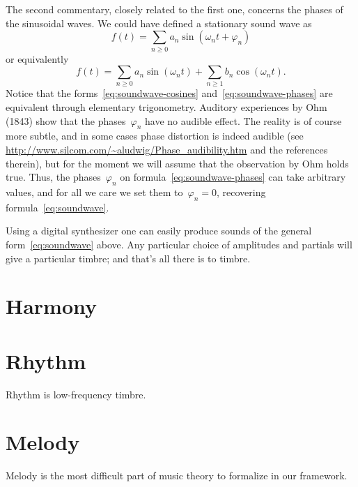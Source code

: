 The second commentary, closely related to the first one, concerns the phases of
the sinusoidal waves.  We could have defined a stationary sound wave as
\begin{equation}\label{eq:soundwave-phases}
	f(t)=\sum_{n\ge 0}a_n\sin(\omega_nt+\varphi_n)
\end{equation}
or equivalently
\begin{equation}\label{eq:soundwave-cosines}
	f(t)=
	\sum_{n\ge 0}a_n\sin(\omega_nt)
	+\sum_{n\ge 1}b_n\cos(\omega_nt).
\end{equation}
Notice that the forms~\ref{eq:soundwave-cosines}
and~\ref{eq:soundwave-phases} are equivalent through elementary trigonometry.
Auditory experiences by Ohm (1843) show that the phases~$\varphi_n$
have no audible effect.  The reality is of course more subtle, and in some
cases phase distortion is indeed audible (see
\url{http://www.silcom.com/~aludwig/Phase_audibility.htm} and the references
therein), but for the moment we will assume that the observation by Ohm holds
true.  Thus, the phases~$\varphi_n$ on formula~\ref{eq:soundwave-phases} can
take arbitrary values, and for all we care we set them to~$\varphi_n=0$,
recovering formula~\ref{eq:soundwave}.

Using a digital synthesizer one can easily produce sounds of the general
form~\ref{eq:soundwave} above.  Any particular choice of amplitudes and
partials will give a particular timbre; and that's all there is to timbre.










\section{Harmony}






% 

\section{Rhythm}

Rhythm is low-frequency timbre.

\section{Melody}

Melody is the most difficult part of music theory to formalize in our
framework.



